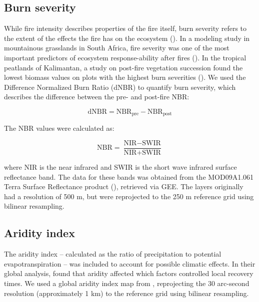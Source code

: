 \documentclass[
  fontsize=12pt,
  paper=a4,
  parskip=half,
  headings=big,
  DIV=12
]{scrreprt}
\begin{document}
\subsection{Burn severity}

While fire intensity describes properties of the fire itself, burn severity refers to the extent of the effects the fire has on the ecosystem (\cite{keeley_fire_2008}). In a modeling study in mountainous grasslands in South Africa, fire severity was one of the most important predictors of ecosystem response-ability after fires (\cite{adagbasa_development_2020}). In the tropical peatlands of Kalimantan, a study on post-fire vegetation succession found the lowest biomass values on plots with the highest burn severities (\cite{hoscilo_development_2008}). We used the Difference Normalized Burn Ratio (dNBR) to quantify burn severity, which describes the difference between the pre- and post-fire NBR:

\begin{equation} \label{eq:dnbr}
    \text{dNBR} = \text{NBR}_{\text{pre}} - \text{NBR}_{\text{post}}
\end{equation}

The NBR values were calculated as:

\begin{equation} \label{eq:nbr}
    \text{NBR} = \frac{\text{NIR} - \text{SWIR}}{\text{NIR} + \text{SWIR}}
\end{equation}

where NIR is the near infrared and SWIR is the short wave infrared surface reflectance band. The data for these bands was obtained from the MOD09A1.061 Terra Surface Reflectance product (\cite{vermote_modisterra_2025}), retrieved via GEE. The layers originally had a resolution of 500 m, but were reprojected to the 250 m reference grid using bilinear resampling.

\subsection{Aridity index}

The aridity index -- calculated as the ratio of precipitation to potential evapotranspiration -- was included to account for possible climatic effects. In their global analysis, \textcite{xu_global_2024} found that aridity affected which factors controlled local recovery times. We used a global aridity index map from \textcite{zomer_version_2022}, reprojecting the 30 arc-second resolution (approximately 1 km) to the reference grid using bilinear resampling.
\end{document}
